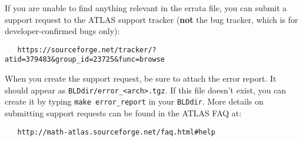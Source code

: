 \documentclass[11pt]{article}
\begin{document}
If you are unable to find anything relevant in the errata file, you can
submit a support request to the ATLAS support tracker ({\bf not} the
bug tracker, which is for developer-confirmed bugs only):
\vspace*{-0.1in}
\begin{verbatim}
   https://sourceforge.net/tracker/?atid=379483&group_id=23725&func=browse
\end{verbatim}

When you create the support request, be sure to attach the error report.
It should appear as \verb|BLDdir/error_<arch>.tgz|.  If this file doesn't
exist, you can create it by typing \verb|make error_report| in your
{\tt BLDdir}.  More details on submitting support requests can be found
in the ATLAS FAQ at:
\vspace*{-0.1in}
\begin{verbatim}
   http://math-atlas.sourceforge.net/faq.html#help
\end{verbatim}





\end{document}
